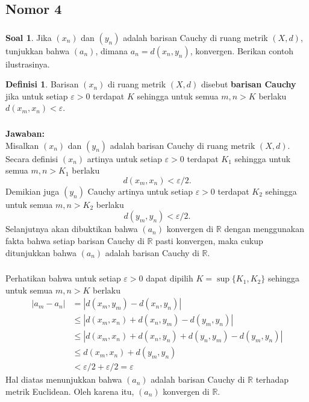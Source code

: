\documentclass[aspectratio=169]{beamer}
\theoremstyle{definition}
\newtheorem{definisi}{Definisi}
\newtheorem{soal}{Soal}
\newcommand{\R}{\mathbb{R}}
\begin{document}
\subsection{Nomor 4}
\begin{frame}
  \frametitle{\insertsection}
  \begin{soal}
    Jika $(x_n)$ dan $(y_n)$ adalah barisan Cauchy di ruang metrik $(X, d)$, tunjukkan bahwa $(a_n)$, dimana $a_n = d(x_n, y_n)$, konvergen. Berikan contoh ilustrasinya.
  \end{soal}
  \begin{definisi}
    Barisan $(x_n)$ di ruang metrik $(X, d)$ disebut \textbf{barisan Cauchy} jika untuk setiap $\varepsilon > 0$ terdapat $K$ sehingga untuk semua $m, n > K$ berlaku $d(x_m, x_n) < \varepsilon$. 
  \end{definisi}
\end{frame}

\begin{frame}
  \frametitle{\insertsection}
  \framesubtitle{\insertsubsection}
  \textbf{Jawaban:}\\
  Misalkan $(x_n)$ dan $(y_n)$ adalah barisan Cauchy di ruang metrik $(X, d)$. Secara definisi $(x_n)$ artinya untuk setiap $\varepsilon > 0$ terdapat $K_1$ sehingga untuk semua $m, n > K_1$ berlaku 
  \[d(x_m, x_n) < \varepsilon/2.\] 
  Demikian juga $(y_n)$ Cauchy artinya untuk setiap $\varepsilon > 0$ terdapat $K_2$ sehingga untuk semua $m, n > K_2$ berlaku 
  \[d(y_m, y_n) < \varepsilon/2.\]
  Selanjutnya akan dibuktikan bahwa $(a_n)$ konvergen di $\R$ dengan menggunakan fakta bahwa setiap barisan Cauchy di $\R$ pasti konvergen, maka cukup ditunjukkan bahwa $(a_n)$ adalah barisan Cauchy di $\R$.
\end{frame}

\begin{frame}
  \frametitle{\insertsection}
  \framesubtitle{\insertsubsection}
  Perhatikan bahwa untuk setiap $\varepsilon > 0$ dapat dipilih $K = \sup\{K_1, K_2\}$ sehingga untuk semua $m, n > K$ berlaku
  \begin{align*}
    |a_m - a_n| &= |d(x_m, y_m) - d(x_n, y_n)|\\
    &\leq |d(x_m, x_n) + d(x_n,y_m) - d(y_m, y_n)|\\
    &\leq |d(x_m, x_n) + d(x_n,y_n) + d(y_n,y_m) - d(y_m, y_n)|\\
    &\leq d(x_m, x_n) + d(y_m, y_n)\\
    &< \varepsilon/2 + \varepsilon/2= \varepsilon
  \end{align*}
  Hal diatas menunjukkan bahwa $(a_n)$ adalah barisan Cauchy di $\R$ terhadap metrik Euclidean. Oleh karena itu, $(a_n)$ konvergen di $\R$.  
\end{frame}
\end{document}
